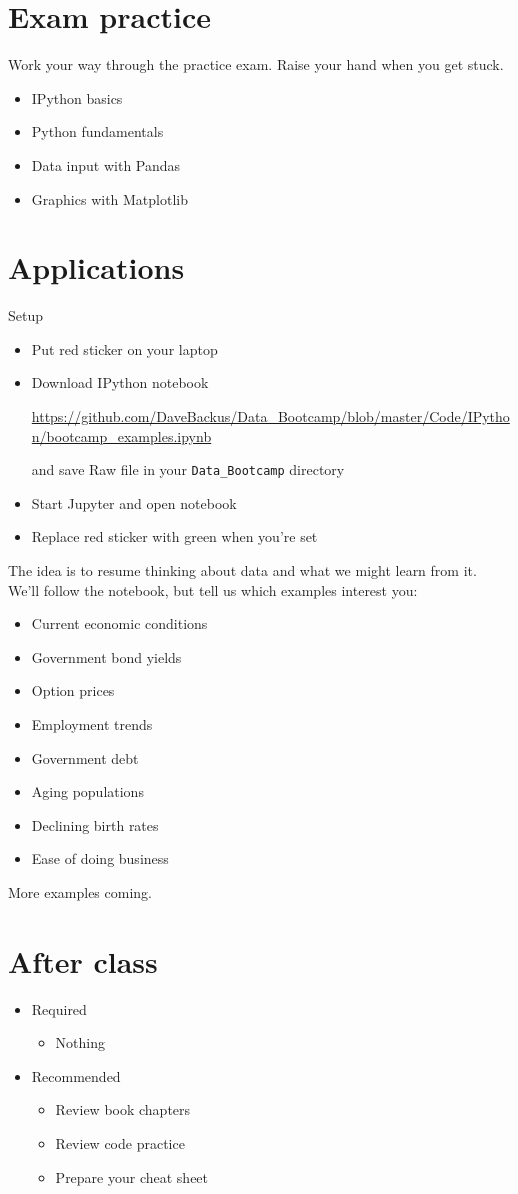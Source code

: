 \documentclass[11pt]{article}
\begin{document}
\section*{Exam practice}

Work your way through the practice exam.  Raise your hand when you get stuck.
\begin{itemize}
\item IPython basics
\item Python fundamentals
\item Data input with Pandas
\item Graphics with Matplotlib
\end{itemize}


\section*{Applications}

{Setup}
\begin{itemize}
\item Put red sticker on your laptop

\item Download IPython notebook

\url{https://github.com/DaveBackus/Data_Bootcamp/blob/master/Code/IPython/bootcamp_examples.ipynb} %

and save Raw file in your \verb|Data_Bootcamp| directory
\item Start Jupyter and open notebook
\item Replace red sticker with green when you're set
\end{itemize}

The idea is to resume thinking about data and what we might learn from it.  
We'll follow the notebook, but tell us which examples interest you:
\begin{itemize}
\item Current economic conditions
\item Government bond yields
\item Option prices
\item Employment trends
\item Government debt
\item Aging populations
\item Declining birth rates
\item Ease of doing business
\end{itemize}
More examples coming.  

\section*{After class}

\begin{itemize}
\item Required
\begin{itemize}
\item Nothing
\end{itemize}
\item Recommended
\begin{itemize}
\item Review book chapters
\item Review code practice
\item Prepare your cheat sheet
\end{itemize}
\end{itemize}


\end{document}
